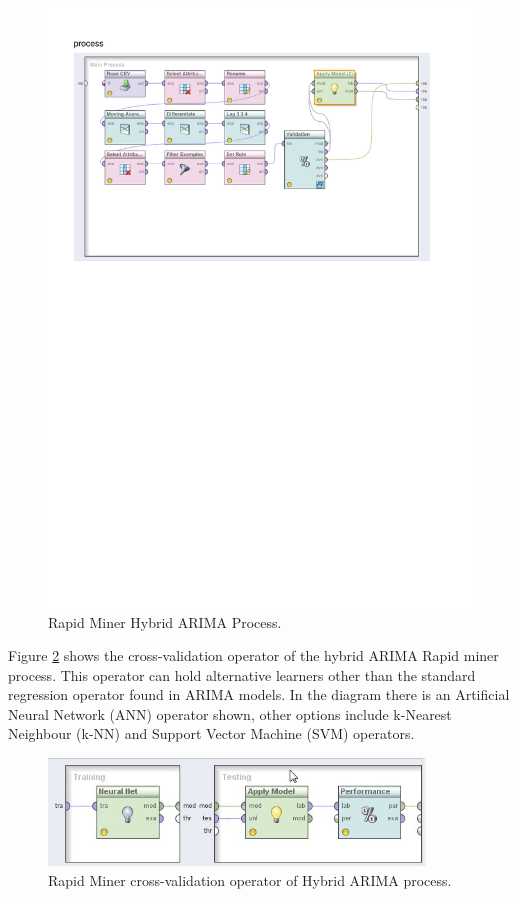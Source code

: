 \begin{figure}[!tbh]
\centering
\includegraphics[width=12cm]{../Figures/chp_ts_rm_arima}
\caption[Rapid Miner Hybrid ARIMA Process]{Rapid Miner Hybrid ARIMA Process.}
\label{fig:chp_ts_rm_arima}
\end{figure}

Figure \ref{fig:chp_ts_rm_arima_validation} shows the cross-validation operator of the hybrid ARIMA Rapid miner process. This operator can hold alternative learners other than the standard regression operator found in ARIMA models. In the diagram there is an Artificial Neural Network (ANN) operator shown, other options include k-Nearest Neighbour (k-NN) and Support Vector Machine (SVM) operators.

\begin{figure}[h!]
\centering
\includegraphics[width=10cm]{../Figures/chp_ts_rm_arima_validation}
\caption[Rapid Miner cross-validation operator]{Rapid Miner cross-validation operator of Hybrid ARIMA process.}
\label{fig:chp_ts_rm_arima_validation}
\end{figure}

